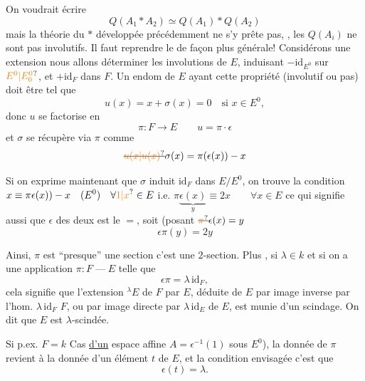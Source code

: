On voudrait écrire 
\[
Q(A_1*A_2)\simeq Q(A_1)*Q(A_2)
\]
mais la théorie du $*$ développée
précédemment ne s'y prête pas, ,
 les $Q(A_i)$ ne sont pas involutifs.
Il faut reprendre  le  
de façon plus générale!
Considérons une extension
nous allons déterminer les involutions
de $E$, induisant $-\mathrm{id}_{E^0}$ sur $\unsure{E^0|E_0^0}$, et
$+\mathrm{id}_F$ dans $F$. Un endom \inserted{$\sigma$} de $E$ ayant
cette propriété (involutif ou pas) doit
être tel que
\[
u(x)=x+\sigma(x)=0\quad\text{si }x\in E^0,
\]
donc $u$ se factorise en
\[
\pi:F\longrightarrow E\qquad u=\pi\cdot\epsilon
\]
et  $\sigma$ se récupère via $\pi$ comme
\[
\deleted{\unsure{u(x|u(x)}} \sigma(x)=\pi(\epsilon(x))-x
\]

Si on exprime maintenant que
$\sigma$ induit $\mathrm{id}_F$ dans $E/E^0$, on trouve
la condition \(\displaystyle x\equiv\pi\epsilon(x))-x\quad(E^0)\quad\forall \unsure{1|x}\in E\)
i.e. \(\displaystyle \pi\underbrace{\epsilon(x)}_{y}\equiv2x\qquad\forall x\in E\)
ce qui signifie aussi que  $\epsilon$ des deux
 est le $=$, soit (posant $\deleted{\unsure{\pi}}\epsilon(x)=y$
\[
\boxed{\epsilon\pi(y)=2y}
\]

Ainsi, $\pi$ est ``presque'' une section
c'est une $2$-section.  Plus ,
si $\lambda\in k$ et si on a une application
$\pi:F\mathbin{\text{---}}E$ telle que
\[
\epsilon\pi=\lambda\,\mathrm{id}_F,
\]
cela signifie que l'extension
$ {}^{\lambda}E$ de $F$ par $E$, déduite de $E$ par
image inverse par l'hom. $\lambda\,\mathrm{id}_F$  $F$,
ou par image directe par $\lambda\,\mathrm{id}_E$ de $E$,
est munie d'un scindage.
On dit que $E$ est $\lambda$-scindée.

Si p.ex. $F=k$ Cas \uline{d'}\uline{un} espace
affine $A=\epsilon^{-1}(1)$ sous $E^0$), la
donnée de $\pi$  revient à la donnée
d'un élément $t$ de $E$, et la
condition envisagée c'est que
\[
\epsilon(t)=\lambda .
\]

